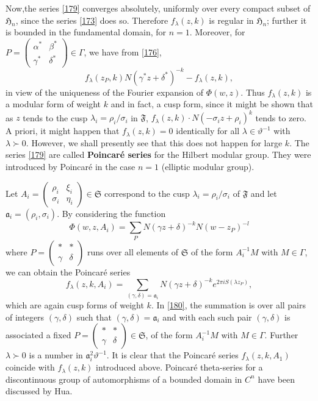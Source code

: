 Now,\pageoriginale the series \eqref{179} converges absolutely,
uniformly over every compact subset of $\mathfrak{H}_{n}$, since the
series \eqref{173} does so. Therefore $f_{\lambda}(z,k)$ is regular in
$\mathfrak{H}_{n}$; further it is bounded in the fundamental domain,
for $n=1$. Moreover, for $P=\left(\begin{smallmatrix} \alpha^{\ast} &
  \beta^{\ast}\\ \gamma^{\ast} & \delta^{\ast}
\end{smallmatrix}\right)\in\Gamma$, we have from \eqref{176},
$$
f_{\lambda}(z_{P},k)N(\gamma^{\ast}z+\delta^{\ast})^{-k}-f_{\lambda}(z,k),
$$
in view of the uniqueness of the Fourier expansion of
$\Phi(w,z)$. Thus $f_{\lambda}(z,k)$ is a modular form of weight $k$
and in fact, a cusp form, since it might be shown that as $z$ tends to
the cusp $\lambda_{i}=\rho_{i}/\sigma_{i}$ in $\mathfrak{F}$,
$f_{\lambda}(z,k)\cdot N(-\sigma_{i}z+\rho_{i})^{k}$ tends to zero. A
priori, it might happen that $f_{\lambda}(z,k)=0$ identically for all
$\lambda\in\vartheta^{-1}$ with $\lambda \succ 0$. However, we shall
presently see that this does not happen for large $k$. The series
\eqref{179} are called {\bf Poincar\'e series} for the Hilbert modular
group. They were introduced by Poincar\'e in the case $n=1$ (elliptic
modular group).

Let $A_{i}=\left(\begin{smallmatrix} \rho_{i} & \xi_{i}\\ \sigma_{i} &
  \eta_{i}
\end{smallmatrix}\right)\in\mathfrak{S}$ correspond to the cusp
$\lambda_{i}=\rho_{i}/\sigma_{i}$ of $\mathfrak{F}$ and let
$\mathfrak{a}_{i}=(\rho_{i},\sigma_{i})$. By considering the function
$$
\Phi(w,z,A_{i})=\sum_{P}N(\gamma z+\delta)^{-k}N(w-z_{P})^{-l}
$$
where $P=\left(\begin{smallmatrix} \ast & \ast\\ \gamma & \delta
\end{smallmatrix}\right)$ runs over all elements of $\mathfrak{S}$ of
the form $A^{-1}_{i}M$ with $M\in\Gamma$, we can obtain the Poincar\'e
series
\begin{equation*}
f_{\lambda}(z,k,A_{i})=\sum_{(\gamma,\delta)=\mathfrak{a}_{i}}N(\gamma
z+\delta)^{-k}e^{2\pi iS(\lambda z_{P})},\tag{180}\label{180}
\end{equation*}
which are again cusp forms of weight $k$. In \eqref{180}, the
summation is over all pairs of integers $(\gamma,\delta)$ such that
$(\gamma,\delta)=\mathfrak{a}_{i}$ and with each such pair
$(\gamma,\delta)$ is associated a fixed $P=\left(\begin{smallmatrix}
  \ast & \ast\\ \gamma & \delta
\end{smallmatrix}\right)\in\mathfrak{S}$, of the form $A^{-1}_{i}M$
with $M\in\Gamma$. Further $\lambda \succ 0$ is a number in
$\mathfrak{a}^{2}_{i}\vartheta^{-1}$. It is clear that the Poincar\'e
series $f_{\lambda}(z,k,A_{1})$ coincide with $f_{\lambda}(z,k)$
introduced above. Poincar\'e theta-series for a discontinuous group of
automorphisms of a bounded domain in $C^{n}$ have been discussed by
Hua.

